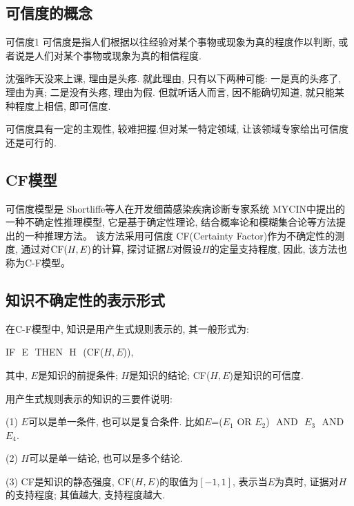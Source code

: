 \subsection{可信度的概念}
\begin{mydef}{可信度}{1}
    可信度是指人们根据以往经验对某个事物或现象为真的程度作以判断, 或者说是人们对某个事物或现象为真的相信程度.
\end{mydef}

\begin{example}
  沈强昨天没来上课, 理由是头疼. 就此理由, 只有以下两种可能: 一是真的头疼了, 理由为真; 二是没有头疼, 理由为假. 但就听话人而言, 因不能确切知道, 就只能某种程度上相信, 即可信度.
\end{example}

\begin{remark}
    可信度具有一定的主观性, 较难把握.但对某一特定领域, 让该领域专家给出可信度还是可行的.
\end{remark}
\subsection{CF模型}
可信度模型是 Shortliffe等人在开发细菌感染疾病诊断专家系统 MYCIN中提出的一种不确定性推理模型, 它是基于确定性理论, 结合概率论和模糊集合论等方法提出的一种推理方法。
该方法采用可信度 CF(Certainty Factor)作为不确定性的测度, 通过对$\textup{CF}(H,E)$的计算, 探讨证据$E$对假设$H$的定量支持程度, 因此, 该方法也称为C-F模型。
\subsection{知识不确定性的表示形式}
在C-F模型中, 知识是用产生式规则表示的, 其一般形式为:
\begin{center}
    IF\,\,   E\,\,    THEN\,\,  H\,\, (CF($H, E$)),
\end{center}
其中, $E$是知识的前提条件; $H$是知识的结论; CF($H, E$)是知识的可信度.
\begin{remark}
用产生式规则表示的知识的三要件说明:

(1) $E$可以是单一条件, 也可以是复合条件. 比如$E$=($E_1$  OR  $E_2$)\,\,  AND\,\,  $E_3$\,\,  AND\,\,  $E_4$.

(2) $H$可以是单一结论, 也可以是多个结论.

(3) \textup{CF}是知识的静态强度, $\textup{CF}(H, E$)的取值为$[-1, 1]$, 表示当$E$为真时, 证据对$H$的支持程度; 其值越大, 支持程度越大.
\end{remark}

